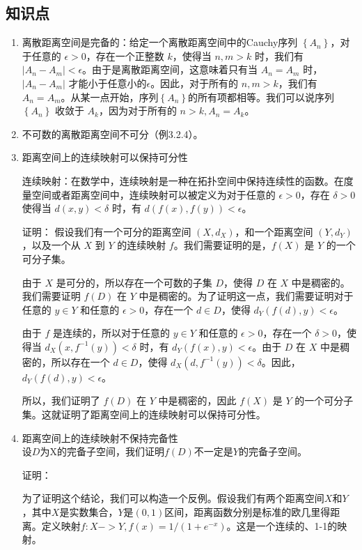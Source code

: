 \documentclass{article}
\begin{document}
\subsection{知识点}
\begin{enumerate}

\item 离散距离空间是完备的：给定一个离散距离空间中的Cauchy序列 $\left\{A_n\right\}$，对于任意的 $\epsilon > 0$，存在一个正整数 $k$，使得当 $n, m > k$ 时，我们有 $|A_n - A_m| < \epsilon$。由于是离散距离空间，这意味着只有当 $A_n = A_m$ 时，$|A_n - A_m|$ 才能小于任意小的$\epsilon$。因此，对于所有的 $n, m > k$，我们有 $A_n = A_m$。从某一点开始，序列$\left\{A_n\right\}$的所有项都相等。我们可以说序列 $\left\{A_n\right\}$ 收敛于 $A_k$，因为对于所有的 $n > k, A_n = A_k$。

\item 不可数的离散距离空间不可分（例3.2.4）。

\item 距离空间上的连续映射可以保持可分性

连续映射：在数学中，连续映射是一种在拓扑空间中保持连续性的函数。在度量空间或者距离空间中，连续映射可以被定义为对于任意的 $\epsilon > 0$，存在 $\delta > 0$ 使得当 $d(x, y) < \delta$ 时，有 $d(f(x), f(y)) < \epsilon$。

证明：
假设我们有一个可分的距离空间 $(X, d_X)$，和一个距离空间 $(Y, d_Y)$，以及一个从 $X$ 到 $Y$ 的连续映射 $f$。我们需要证明的是，$f(X)$ 是 $Y$ 的一个可分子集。

由于 $X$ 是可分的，所以存在一个可数的子集 $D$，使得 $D$ 在 $X$ 中是稠密的。我们需要证明 $f(D)$ 在 $Y$ 中是稠密的。为了证明这一点，我们需要证明对于任意的 $y \in Y$ 和任意的 $\epsilon > 0$，存在一个 $d \in D$，使得 $d_Y(f(d), y) < \epsilon$。

由于 $f$ 是连续的，所以对于任意的 $y \in Y$ 和任意的 $\epsilon > 0$，存在一个 $\delta > 0$，使得当 $d_X(x, f^{-1}(y)) < \delta$ 时，有 $d_Y(f(x), y) < \epsilon$。由于 $D$ 在 $X$ 中是稠密的，所以存在一个 $d \in D$，使得 $d_X(d, f^{-1}(y)) < \delta$。因此，$d_Y(f(d), y) < \epsilon$。

所以，我们证明了 $f(D)$ 在 $Y$ 中是稠密的，因此 $f(X)$ 是 $Y$ 的一个可分子集。这就证明了距离空间上的连续映射可以保持可分性。
\item 距离空间上的连续映射不保持完备性\\
设$D$为X的完备子空间，我们证明$f(D)$不一定是$Y$的完备子空间。

证明：

为了证明这个结论，我们可以构造一个反例。假设我们有两个距离空间$X$和$Y$，其中$X$是实数集合，$Y$是$(0,1)$区间，距离函数分别是标准的欧几里得距离。定义映射$f:X->Y, f(x)=1/(1+e^{-x})$。这是一个连续的、1-1的映射。


\end{enumerate}
\end{document}

